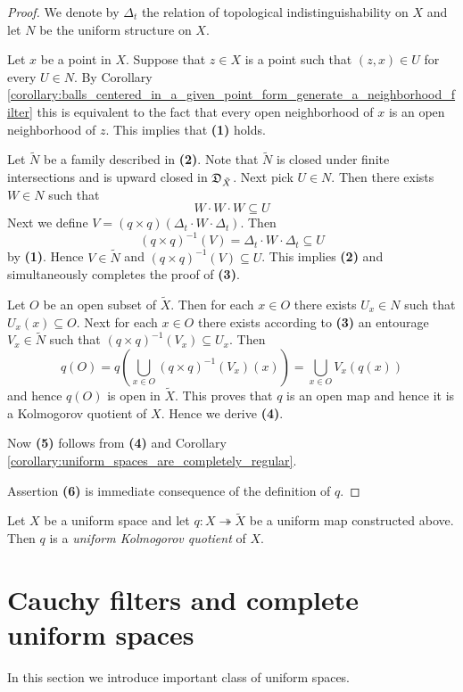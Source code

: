 \documentclass[10pt]{amsart}
\begin{document}
\begin{proof}
	We denote by $\Delta_t$ the relation of topological indistinguishability on $X$ and let $N$ be the uniform structure on $X$.

	Let $x$ be a point in $X$. Suppose that $z \in X$ is a point such that $(z, x) \in U$ for every $U \in N$. By Corollary \ref{corollary:balls_centered_in_a_given_point_form_generate_a_neighborhood_filter} this is equivalent to the fact that every open neighborhood of $x$ is an open neighborhood of $z$. This implies that \textbf{(1)} holds.

	Let $\tilde{N}$ be a family described in \textbf{(2)}. Note that $\tilde{N}$ is closed under finite intersections and is upward closed in ${\mathfrak D}_{\tilde{X}}$. Next pick $U \in N$. Then there exists $W \in N$ such that
	$$W\cdot W \cdot W \subseteq U$$
	Next we define $V = \left(q\times q\right)\left(\Delta_t\cdot W\cdot \Delta_t\right)$. Then
	$$\left(q\times q\right)^{-1}(V) = \Delta_t\cdot W\cdot \Delta_t \subseteq U$$
	by \textbf{(1)}. Hence $V \in \tilde{N}$ and $\left(q\times q\right)^{-1}(V)\subseteq U$. This implies \textbf{(2)} and simultaneously completes the proof of \textbf{(3)}.

	Let $O$ be an open subset of $\tilde{X}$. Then for each $x \in O$ there exists $U_x \in N$ such that $U_x(x)\subseteq O$. Next for each $x \in O$ there exists according to \textbf{(3)} an entourage $V_x \in \tilde{N}$ such that $\left(q\times q\right)^{-1}(V_x) \subseteq U_x$. Then
	$$q(O) = q\left(\bigcup_{x\in O}\left(q\times q\right)^{-1}(V_x)(x)\right) = \bigcup_{x \in O}V_x\left(q(x)\right)$$
	and hence $q(O)$ is open in $\tilde{X}$. This proves that $q$ is an open map and hence it is a Kolmogorov quotient of $X$. Hence we derive \textbf{(4)}.

	Now \textbf{(5)} follows from \textbf{(4)} and Corollary \ref{corollary:uniform_spaces_are_completely_regular}.

	Assertion \textbf{(6)} is immediate consequence of the definition of $q$.
\end{proof}

\begin{definition}
	Let $X$ be a uniform space and let $q:X\twoheadrightarrow \tilde{X}$ be a uniform map constructed above. Then $q$ is a \textit{uniform Kolmogorov quotient} of $X$.
\end{definition}

\section{Cauchy filters and complete uniform spaces}
\noindent
In this section we introduce important class of uniform spaces.
\end{document}
